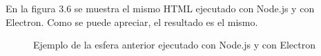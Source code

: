 En la figura 3.6 se muestra el mismo HTML ejecutado con Node.js y con Electron. Como se puede apreciar, el resultado es el mismo.

\begin{figure}[H]
  \begin{center}
    \caption{Ejemplo de la esfera anterior ejecutado con Node.js y con Electron}
     \label{fig.ejemplohtmlcomm}
     \end{center}
\end{figure}






